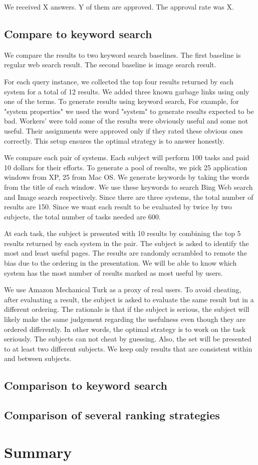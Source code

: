 \documentclass{www2010-submission}
\begin{document}
We received X answers. Y of them are approved. The approval rate
was X.

\subsection{Compare to keyword search}

We compare the results to two keyword search baselines. The first
baseline is regular web search result. The second baseline is
image search result.

For each query instance, we collected the top four results
returned by each system for a total of 12 results. We added three
known garbage links using only one of the terms. To generate
results using keyword search, For example, for "system properties"
we used the word "system" to generate results expected to be bad.
Workers' were told some of the results were obviously useful and
some not useful. Their assignments were approved only if they
rated these obvious ones correctly. This setup ensures the optimal
strategy is to answer honestly.

We compare each pair of systems. Each subject will perform 100
tasks and paid 10 dollars for their efforts. To generate a pool of
results, we pick 25 application windows from XP, 25 from Mac OS.
We generate keywords by taking the words from the title of each
window. We use these keywords to search Bing Web search and Image
search respectively. Since there are three systems, the total
number of results are 150. Since we want each result to be
evaluated by twice by two subjects, the total number of tasks
needed are 600.

At each task, the subject is presented with 10 results by
combining the top 5 results returned by each system in the pair.
The subject is asked to identify the most and least useful pages.
The results are randomly scrambled to remote the bias due to the
ordering in the presentation. We will be able to know which system
has the most number of results marked as most useful by users.

We use Amazon Mechanical Turk as a proxy of real users. To avoid
cheating, after evaluating a result, the subject is asked to
evaluate the same result but in a different ordering. The
rationale is that if the subject is serious, the subject will
likely make the same judgement regarding the usefulness even
though they are ordered differently. In other words, the optimal
strategy is to work on the task seriously. The subjects can not
cheat by guessing. Also, the set will be presented to at least two
different subjects. We keep only results that are consistent
within and between subjects.

\subsection{Comparison to keyword search}

\subsection{Comparison of several ranking strategies}

\section{Summary}


\balancecolumns %
\end{document}
